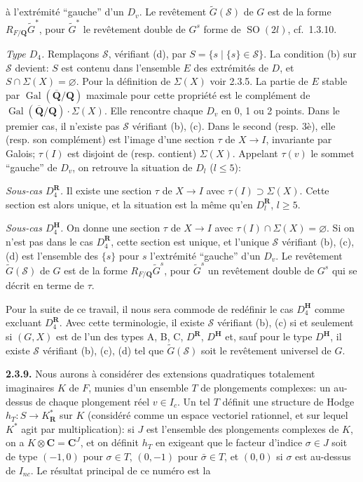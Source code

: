 \documentclass[10pt,a4paper]{article}
\newcommand{\SourcePage}[2]{\clearpage\setcounter{page}{#2}\typeout{D031_SOURCE_PAGE physical=#1 printed=#2}}
\begin{document}
\SourcePage{26}{272}
à l'extrémité ``gauche'' d'un \(D_v\). Le revêtement \(\widetilde G(\mathscr S)\) de \(G\) est de la forme \(R_{F/\mathbf Q}\widetilde G^*\), pour \(\widetilde G^*\) le revêtement double de \(G^s\) forme de \(\operatorname{SO}(2l)\), cf.~1.3.10.

\emph{Type \(D_4\).} Remplaçons \(\mathscr S\), vérifiant (d), par \(S=\{s\mid\{s\}\in\mathscr S\}\). La condition (b) sur \(\mathscr S\) devient: \(S\) est contenu dans l'ensemble \(E\) des extrémités de \(D\), et \(S\cap\Sigma(X)=\varnothing\). Pour la définition de \(\Sigma(X)\) voir 2.3.5. La partie de \(E\) stable par \(\operatorname{Gal}(\overline{\mathbf Q}/\mathbf Q)\) maximale pour cette propriété est le complément de \(\operatorname{Gal}(\overline{\mathbf Q}/\mathbf Q)\cdot\Sigma(X)\). Elle rencontre chaque \(D_v\) en 0, 1 ou 2 points. Dans le premier cas, il n'existe pas \(\mathscr S\) vérifiant (b), (c). Dans le second (resp. 3è), elle (resp. son complément) est l'image d'une section \(\tau\) de \(X\to I\), invariante par Galois; \(\tau(I)\) est disjoint de (resp. contient) \(\Sigma(X)\). Appelant \(\tau(v)\) le sommet ``gauche'' de \(D_v\), on retrouve la situation de \(D_l\) (\(l\le5\)):

\emph{Sous-cas \(D_4^{\mathbf R}\).} Il existe une section \(\tau\) de \(X\to I\) avec \(\tau(I)\supset\Sigma(X)\). Cette section est alors unique, et la situation est la même qu'en \(D_l^{\mathbf R}\), \(l\ge5\).

\emph{Sous-cas \(D_4^{\mathbf H}\).} On donne une section \(\tau\) de \(X\to I\) avec \(\tau(I)\cap\Sigma(X)=\varnothing\). Si on n'est pas dans le cas \(D_4^{\mathbf R}\), cette section est unique, et l'unique \(\mathscr S\) vérifiant (b), (c), (d) est l'ensemble des \(\{s\}\) pour \(s\) l'extrémité ``gauche'' d'un \(D_v\). Le revêtement \(\widetilde G(\mathscr S)\) de \(G\) est de la forme \(R_{F/\mathbf Q}\widetilde G^s\), pour \(\widetilde G^s\) un revêtement double de \(G^s\) qui se décrit en terme de \(\tau\).

Pour la suite de ce travail, il nous sera commode de redéfinir le cas \(D_4^{\mathbf H}\) comme excluant \(D_4^{\mathbf R}\). Avec cette terminologie, il existe \(\mathscr S\) vérifiant (b), (c) si et seulement si \((G,X)\) est de l'un des types A, B, C, \(D^{\mathbf R}\), \(D^{\mathbf H}\) et, sauf pour le type \(D^{\mathbf H}\), il existe \(\mathscr S\) vérifiant (b), (c), (d) tel que \(\widetilde G(\mathscr S)\) soit le revêtement universel de \(G\).

\textbf{2.3.9.} Nous aurons à considérer des extensions quadratiques totalement imaginaires \(K\) de \(F\), munies d'un ensemble \(T\) de plongements complexes: un au-dessus de chaque plongement réel \(v\in I_c\). Un tel \(T\) définit une structure de Hodge \(h_T:S\to K_{\mathbf R}^*\) sur \(K\) (considéré comme un espace vectoriel rationnel, et sur lequel \(K^*\) agit par multiplication): si \(J\) est l'ensemble des plongements complexes de \(K\), on a \(K\otimes\mathbf C=\mathbf C^J\), et on définit \(h_T\) en exigeant que le facteur d'indice \(\sigma\in J\) soit de type \((-1,0)\) pour \(\sigma\in T\), \((0,-1)\) pour \(\bar\sigma\in T\), et \((0,0)\) si \(\sigma\) est au-dessus de \(I_{nc}\). Le résultat principal de ce numéro est la
\end{document}
